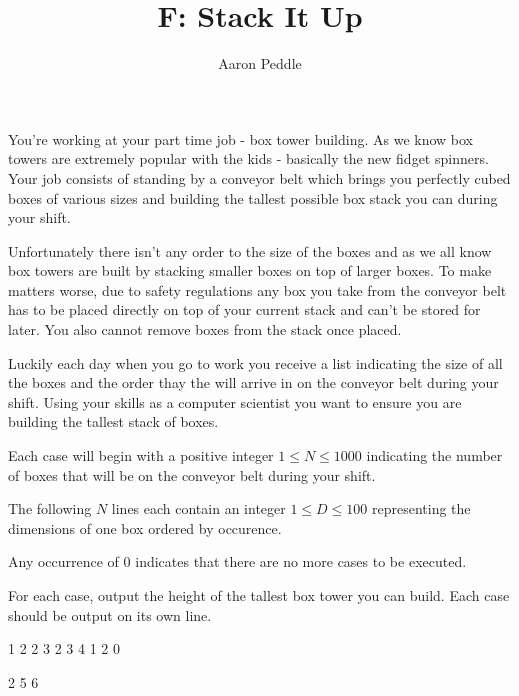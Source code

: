 \documentclass{article}
\title{F: Stack It Up}
\author{Aaron Peddle}
\begin{document}
\begin{problemDescription}
You're working at your part time job - box tower building. As we know box towers are extremely popular with the kids - basically the new fidget spinners. Your job consists of standing by a conveyor belt which brings you perfectly cubed boxes of various sizes and building the tallest possible box stack you can during your shift.

Unfortunately there isn't any order to the size of the boxes and as we all know box towers are built by stacking smaller boxes on top of larger boxes. To make matters worse, due to safety regulations any box you take from the conveyor belt has to be placed directly on top of your current stack and can't be stored for later. You also cannot remove boxes from the stack once placed.

Luckily each day when you go to work you receive a list indicating the size of all the boxes and the order thay the will arrive in on the conveyor belt during your shift. Using your skills as a computer scientist you want to ensure you are building the tallest stack of boxes.

\end{problemDescription}

\begin{inputDescription}
Each case will begin with a positive integer $1 \leq N \leq 1000$  indicating the number of boxes that will be on the conveyor belt during your shift.

The following $N$ lines each contain an integer $1 \leq D \leq 100$ representing the dimensions of one box ordered by occurence.

Any occurrence of $0$ indicates that there are no more cases to be executed.

\end{inputDescription}

\begin{outputDescription}
For each case, output the height of the tallest box tower you can build. Each case should be output on its own line.

\end{outputDescription}

\begin{sampleInput}

1
2
2
3
2
3
4
1
2
0
\end{sampleInput}
\begin{sampleOutput}

2
5
6
\end{sampleOutput}
\end{document}
